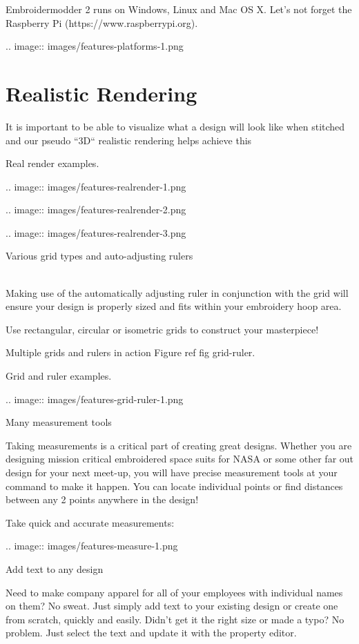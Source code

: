 \documentclass[a4paper]{report}
\begin{document}
Embroidermodder 2 runs on Windows, Linux and Mac OS X. Let's not forget the  Raspberry
Pi (https://www.raspberrypi.org).

.. image::
   images/features-platforms-1.png

\section{Realistic Rendering}

It is important to be able to visualize what a design will look like when stitched and our
pseudo ``3D`` realistic rendering helps achieve this

Real render examples.

.. image::
   images/features-realrender-1.png

.. image::
   images/features-realrender-2.png

.. image::
   images/features-realrender-3.png

Various grid types and auto-adjusting rulers
~~~~~~~~~~~~~~~~~~~~~~~~~~~~~~~~~~~~~~~~~~~~

Making use of the automatically adjusting ruler in conjunction with the grid will ensure your
design is properly sized and fits within your embroidery hoop area.

Use rectangular, circular or isometric grids to construct your masterpiece!

Multiple grids and rulers in action Figure ref fig grid-ruler.

Grid and ruler examples.

.. image::
   images/features-grid-ruler-1.png

Many measurement tools
~~~~~~~~~~~~~~~~~~~~~~

Taking measurements is a critical part of creating great designs. Whether you are designing
mission critical embroidered space suits for NASA or some other far out design for your next
meet-up, you will have precise measurement tools at your command to make it happen. You can
locate individual points or find distances between any 2 points anywhere in the design!

Take quick and accurate measurements:

.. image::
   images/features-measure-1.png

Add text to any design
~~~~~~~~~~~~~~~~~~~~~~

Need to make company apparel for all of your employees with individual names on them? No sweat.
Just simply add text to your existing design or create one from scratch, quickly and easily.
Didn't get it the right size or made a typo? No problem. Just select the text and update it
with the property editor.
\end{document}
